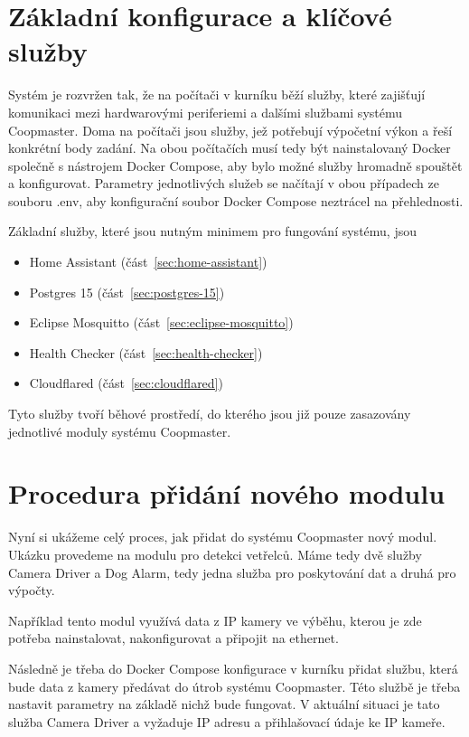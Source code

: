\section*{Základní konfigurace a klíčové služby}


Systém je rozvržen tak, že na počítači v kurníku běží služby, které zajišťují komunikaci mezi hardwarovými periferiemi a dalšími službami systému Coopmaster.
Doma na počítači jsou služby, jež potřebují výpočetní výkon a řeší konkrétní body zadání.
Na obou počítačích musí tedy být nainstalovaný Docker společně s nástrojem Docker Compose, aby bylo možné služby hromadně spouštět a konfigurovat.
Parametry jednotlivých služeb se načítají v obou případech ze souboru .env, aby konfigurační soubor Docker Compose neztrácel na přehlednosti.\newline

Základní služby, které jsou nutným minimem pro fungování systému, jsou
\begin{itemize}
    \item Home Assistant (část~\ref{sec:home-assistant})
    \item Postgres 15 (část~\ref{sec:postgres-15})
    \item Eclipse Mosquitto (část~\ref{sec:eclipse-mosquitto})
    \item Health Checker (část~\ref{sec:health-checker})
    \item Cloudflared (část~\ref{sec:cloudflared})
\end{itemize}
Tyto služby tvoří běhové prostředí, do kterého jsou již pouze zasazovány jednotlivé moduly systému Coopmaster.

\section*{Procedura přidání nového modulu}


Nyní si ukážeme celý proces, jak přidat do systému Coopmaster nový modul.
Ukázku provedeme na modulu pro detekci vetřelců.
Máme tedy dvě služby Camera Driver a Dog Alarm, tedy jedna služba pro poskytování dat a druhá pro výpočty.\newline

Například tento modul využívá data z IP kamery ve výběhu, kterou je zde potřeba nainstalovat, nakonfigurovat a připojit na ethernet.\newline

Následně je třeba do Docker Compose konfigurace v kurníku přidat službu, která bude data z kamery předávat do útrob systému Coopmaster.
Této službě je třeba nastavit parametry na základě nichž bude fungovat.
V aktuální situaci je tato služba Camera Driver a vyžaduje IP adresu a přihlašovací údaje ke IP kameře.\newline

